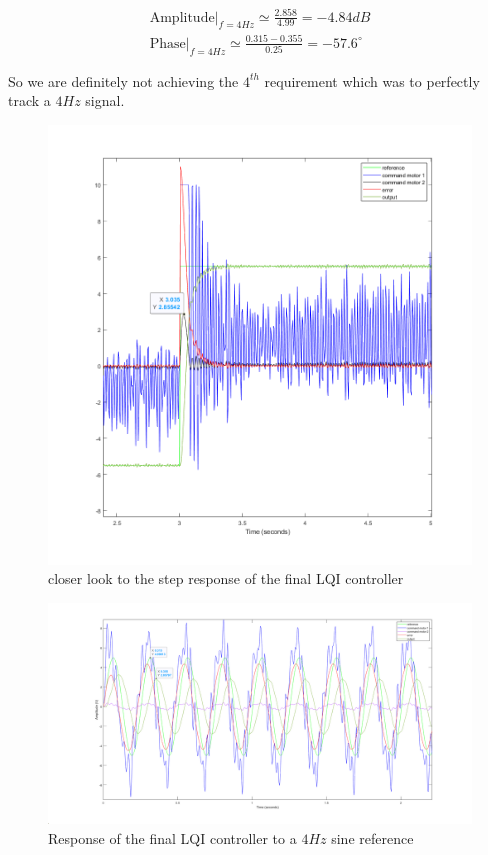 \begin{gather*}
    \text{Amplitude}\Big|_{f = 4 Hz} \simeq \frac{2.858}{4.99} = -4.84 dB\\
    \text{Phase}\Big|_{f = 4 Hz} \simeq \frac{0.315 - 0.355}{0.25} = -57.6^{\circ}
\end{gather*}

So we are definitely not achieving the $4^{th}$ requirement which was to perfectly track a $4 Hz$ signal.

\begin{figure}[H]
    \centering
    \includegraphics[width = \textwidth]{Pictures/McGiver_zoom.png}
    \caption{closer look to the step response of the final LQI controller}
    \label{fig:lqi zoom}
\end{figure}

\begin{figure}[H]
    \centering
    \includegraphics[width = \textwidth]{Pictures/frequency_response.png}
    \caption{Response of the final LQI controller to a $4 Hz$ sine reference}
    \label{fig:lqi 4Hz}
\end{figure}


